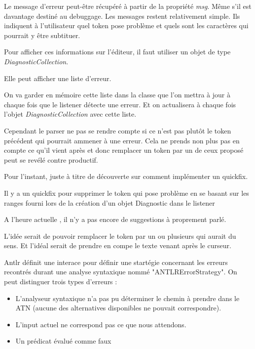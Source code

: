 \documentclass[
    iict, %
    il, %
]{heig-tb}
\begin{document}
Le message d'erreur peut-être récupéré à partir de la propriété \emph{msg}. Même s'il est davantage destiné au debuggage.
Les messages restent relativement simple. Ils indiquent à l'utilisateur quel token pose problème et quels sont les caractères qui pourrait y être subtituer.

Pour afficher ces informations sur l'éditeur, il faut utiliser un objet de type \emph{DiagnosticCollection}.

Elle peut afficher une liste d'erreur.

On va garder en mémoire cette liste dans la classe que l'on mettra à jour à chaque fois que le listener détecte une erreur.
Et on actualisera à chaque fois l'objet \emph{DiagnosticCollection} avec cette liste.

Cependant le parser ne pas se rendre compte si ce n'est pas plutôt le token précédent qui pourrait ammener à une erreur.
Cela ne prends non plus pas en compte ce qu'il vient après et donc remplacer un token par un de ceux proposé peut se revélé contre productif.

Pour l'instant, juste à titre de découverte sur comment implémenter un quickfix. %

Il y a un quickfix pour supprimer le token qui pose problème en se basant sur les ranges fourni lors de la création d'un objet Diagnostic dans le listener %

A l'heure actuelle , il n'y a pas encore de suggestions à proprement parlé.

L'idée serait de pouvoir remplacer le token par un ou plusieurs qui aurait du sens.
Et l'idéal serait de prendre en compe le texte venant après le curseur.





Antlr définit une interace pour définir une startégie concernant les erreurs recontrés durant une analyse syntaxique nommé "ANTLRErrorStrategy".
On peut distinguer trois types d'erreurs :
\begin{itemize}
    \item L'analyseur syntaxique n'a pas pu déterminer le chemin à prendre dans le ATN (aucune des alternatives disponibles ne pouvait correspondre).
    \item L'input actuel ne correspond pas ce que nous attendons.
    \item Un prédicat évalué comme faux
\end{itemize}
\end{document}
